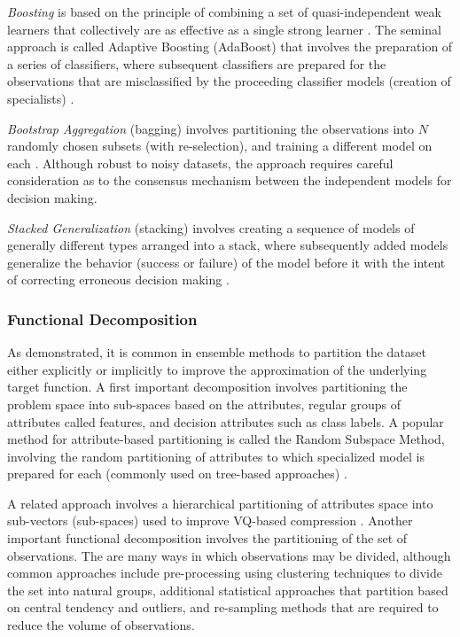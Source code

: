 \documentclass[a4paper, 11pt]{article}
\begin{document}
\emph{Boosting} is based on the principle of combining a set of quasi-independent weak learners that collectively are as effective as a single strong learner \cite{Kearns1988, Schapire1992}. The seminal approach is called Adaptive Boosting (AdaBoost) that involves the preparation of a series of classifiers, where subsequent classifiers are prepared for the observations that are misclassified by the proceeding classifier models (creation of specialists) \cite{Schapire2003}. 

\emph{Bootstrap Aggregation} (bagging) involves partitioning the observations into $N$ randomly chosen subsets (with re-selection), and training a different model on each \cite{Breiman1996}. Although robust to noisy datasets, the approach requires careful consideration as to the consensus mechanism between the independent models for decision making. 

\emph{Stacked Generalization} (stacking) involves creating a sequence of models of generally different types arranged into a stack, where subsequently added models generalize the behavior (success or failure) of the model before it with the intent of correcting erroneous decision making \cite{Wolpert1992, Ting1999}. 
	
\subsubsection{Functional Decomposition}
As demonstrated, it is common in ensemble methods to partition the dataset either explicitly or implicitly to improve the approximation of the underlying target function. A first important decomposition involves partitioning the problem space into sub-spaces based on the attributes, regular groups of attributes called features, and decision attributes such as class labels. A popular method for attribute-based partitioning is called the Random Subspace Method, involving the random partitioning of attributes to which specialized model is prepared for each (commonly used on tree-based approaches) \cite{Ho1998}. 

A related approach involves a hierarchical partitioning of attributes space into sub-vectors (sub-spaces) used to improve VQ-based compression \cite{Gersho1984}. Another important functional decomposition involves the partitioning of the set of observations. The are many ways in which observations may be divided, although common approaches include pre-processing using clustering techniques to divide the set into natural groups, additional statistical approaches that partition based on central tendency and outliers, and re-sampling methods that are required to reduce the volume of observations.
	
\end{document}
